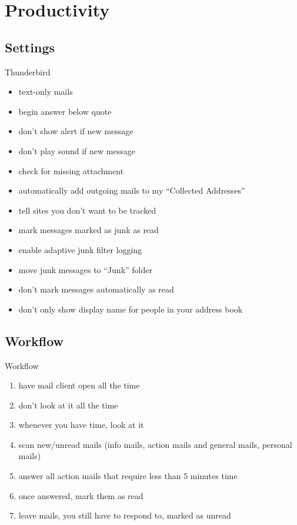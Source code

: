 \documentclass{beamer}
\begin{document}
	\section{Productivity}
	\subsection{Settings}
	\begin{frame}{Thunderbird}
		\begin{itemize}
			\item text-only mails
			\item begin answer below quote
			\item don't show alert if new message
			\item don't play sound if new message
			\item check for missing attachment
			\item automatically add outgoing mails to my ``Collected Addresses''
			\item tell sites you don't want to be tracked
			\item mark messages marked as junk as read
			\item enable adaptive junk filter logging
			\item move junk messages to ``Junk'' folder
			\item don't mark messages automatically as read
			\item don't only show display name for people in your address book
		\end{itemize}
	\end{frame}
	
	\subsection{Workflow}		
	\begin{frame}{Workflow}
		\begin{enumerate}
			\item have mail client open all the time
			\item don't look at it all the time
			\item whenever you have time, look at it
			\item scan new/unread mails (info mails, action mails and general mails, personal mails)
			\item answer all action mails that require less than 5 minutes time
			\item once answered, mark them as read
			\item leave mails, you still have to respond to, marked as unread
		\end{enumerate}
	\end{frame}	
	
\end{document}
